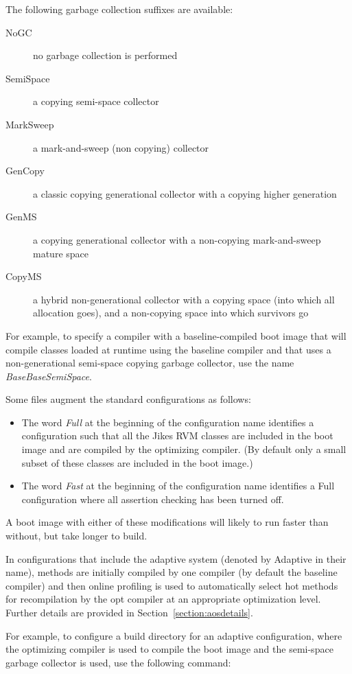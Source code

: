 The following garbage collection suffixes are available:

\begin{description}
\item[NoGC] no garbage collection is performed
\item[SemiSpace] a copying semi-space collector
\item[MarkSweep] a mark-and-sweep (non copying) collector
\item[GenCopy] a classic copying generational collector with a copying
  higher generation
\item[GenMS] a copying generational collector with a non-copying
  mark-and-sweep mature space
\item[CopyMS] a hybrid non-generational collector with a copying space
  (into which all allocation goes), and a non-copying space into which
  survivors go
\end{description}

For example, to specify a compiler with a baseline-compiled boot image
that will compile classes loaded at runtime using the baseline 
compiler and that uses a non-generational semi-space copying garbage
collector, use the name {\em BaseBaseSemiSpace}.

Some files augment the standard configurations as follows:
\begin{itemize}
\item The word 
{\em Full} at the beginning of the configuration name identifies a
configuration such that all the Jikes RVM classes are included in the
boot image and are compiled by the optimizing compiler.  (By default
only a small subset of these classes are included in the boot image.)
\item The word {\em Fast} at the beginning of the configuration name identifies a
Full configuration where all assertion checking has been turned off.
\end{itemize}
A boot image with either of these modifications will likely to run
faster than without, but take longer to build.

In configurations that include the adaptive system (denoted by
Adaptive in their name), methods are initially compiled by one
compiler (by default the baseline compiler) and then online profiling
is used to automatically select hot methods for recompilation by the
opt compiler at an appropriate optimization level. Further details are
provided in Section~\ref{section:aosdetails}.

For example, to configure a build directory for an adaptive
configuration, where the optimizing compiler is used to compile the
boot image and the semi-space garbage collector is used, use the
following command:

